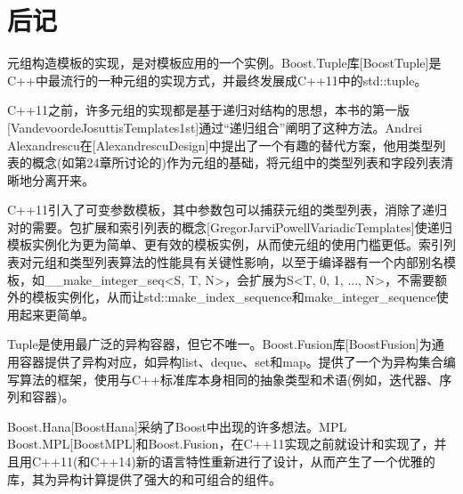 \section{后记}

元组构造模板的实现，是对模板应用的一个实例。Boost.Tuple库[BoostTuple]是C++中最流行的一种元组的实现方式，并最终发展成C++11中的std::tuple。

C++11之前，许多元组的实现都是基于递归对结构的思想，本书的第一版[VandevoordeJosuttisTemplates1st]通过“递归组合”阐明了这种方法。Andrei Alexandrescu在[AlexandrescuDesign]中提出了一个有趣的替代方案，他用类型列表的概念(如第24章所讨论的)作为元组的基础，将元组中的类型列表和字段列表清晰地分离开来。

C++11引入了可变参数模板，其中参数包可以捕获元组的类型列表，消除了递归对的需要。包扩展和索引列表的概念[GregorJarviPowellVariadicTemplates]使递归模板实例化为更为简单、更有效的模板实例，从而使元组的使用门槛更低。索引列表对元组和类型列表算法的性能具有关键性影响，以至于编译器有一个内部别名模板，如\_\_make\_integer\_seq<S, T, N>，会扩展为S<T, 0, 1, ..., N>，不需要额外的模板实例化，从而让std::make\_index\_sequence和make\_integer\_sequence使用起来更简单。

Tuple是使用最广泛的异构容器，但它不唯一。Boost.Fusion库[BoostFusion]为通用容器提供了异构对应，如异构list、deque、set和map。提供了一个为异构集合编写算法的框架，使用与C++标准库本身相同的抽象类型和术语(例如，迭代器、序列和容器)。

Boost.Hana[BoostHana]采纳了Boost中出现的许多想法。MPL Boost.MPL[BoostMPL]和Boost.Fusion，在C++11实现之前就设计和实现了，并且用C++11(和C++14)新的语言特性重新进行了设计，从而产生了一个优雅的库，其为异构计算提供了强大的和可组合的组件。